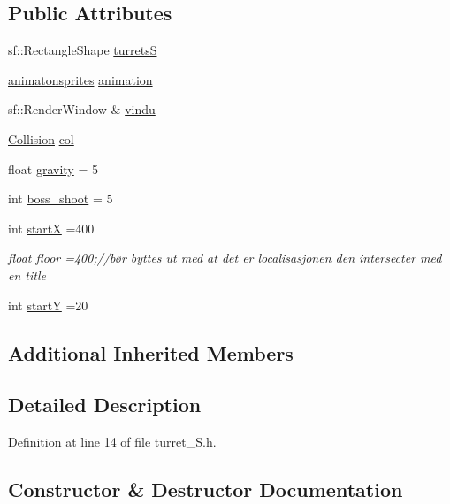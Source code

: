 \subsection*{Public Attributes}
\begin{DoxyCompactItemize}
\item 
sf\+::\+Rectangle\+Shape \hyperlink{classturret___s_a91bc6f294f3277df7337758fd48a2adc}{turretsS}
\item 
\hyperlink{classanimatonsprites}{animatonsprites} \hyperlink{classturret___s_a3191ef59e26fcf5c901775db480a16a2}{animation}
\item 
sf\+::\+Render\+Window \& \hyperlink{classturret___s_a5a21c67328356ed52b566e2e06a5d799}{vindu}
\item 
\hyperlink{class_collision}{Collision} \hyperlink{classturret___s_a2a4209e21831ca2879cdb6bf783db73c}{col}
\item 
float \hyperlink{classturret___s_ac1b492d440c46adde5099139500d834a}{gravity} = 5
\item 
int \hyperlink{classturret___s_a87dbfe5ad2e53ed8b946ebd1a11a9190}{boss\+\_\+shoot} = 5
\item 
int \hyperlink{classturret___s_a115cdd63d3d1db66a45c1854af642458}{startX} =400
\begin{DoxyCompactList}\small\item\em float floor =400;//bør byttes ut med at det er localisasjonen den intersecter med en title \end{DoxyCompactList}\item 
int \hyperlink{classturret___s_aca9fccc5caa87740c08e30024717b930}{startY} =20
\end{DoxyCompactItemize}
\subsection*{Additional Inherited Members}


\subsection{Detailed Description}


Definition at line 14 of file turret\+\_\+\+S.\+h.



\subsection{Constructor \& Destructor Documentation}
\hypertarget{classturret___s_a757d1306bfb2c669e7a9d1f5f66188e3}{}\label{classturret___s_a757d1306bfb2c669e7a9d1f5f66188e3} 
